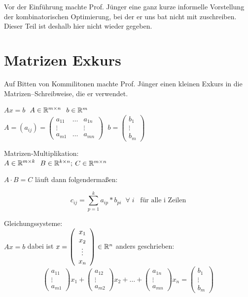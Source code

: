 
Vor der Einführung machte Prof. Jünger eine ganz kurze informelle 
Vorstellung der kombinatorischen Optimierung, bei der er uns bat nicht 
mit zuschreiben. Dieser Teil ist deshalb hier nicht wieder gegeben. 

\section{Matrizen Exkurs}

Auf Bitten von Kommilitonen machte Prof. Jünger einen kleinen Exkurs in die
Matrizen--Schreibweise, die er verwendet. 

$A x = b\;$ $A \in \mathbb{R}^{m\times n}\;$ $b \in \mathbb{R}^{m}$\\
$A = (a_{i j}) = \left(\begin{array}{ccc}a_{11}&\ldots&a_{1n}\\
\vdots&&\vdots\\a_{m1}&\ldots&a_{m n}\end{array}\right)\;$
 $b=\left(\begin{array}{c}b_{1}\\\vdots\\b_{m}\end{array}\right)$

Matrizen-Multiplikation:\\
$A \in \mathbb{R}^{m\times k}\;$ $B \in \mathbb{R}^{k \times n};$ $C \in \mathbb{R}^{m\times n}$ 

$A \cdot B = C$ läuft dann folgendermaßen:

\begin{equation*} 
c_{i j}= \sum^{k}_{p=1} a_{i p} * b_{pi} \; \; \forall\; {i} \;\;\; \mbox{für alle i
Zeilen}
\end{equation*}

Gleichungssysteme:\\
$A x=b$ dabei ist $x=\left(\begin{array}{c}x_{1}\\x_{2}\\\vdots\\x_{n}\end{array}\right) \in \mathbb{R}^{n}$
anders geschrieben:
\[
\left(\begin{array}{c}a_{11}\\\vdots\\a_{m1}\end{array}\right)
x_{1}+
\left(\begin{array}{c}a_{12}\\\vdots\\a_{m2}\end{array}\right)
x_{2}+\ldots+
\left(\begin{array}{c}a_{1n}\\\vdots\\a_{m n}\end{array}\right)
x_{n} =
\left(\begin{array}{c}b_{1}\\\vdots\\b_{m}\end{array}\right)
\]

